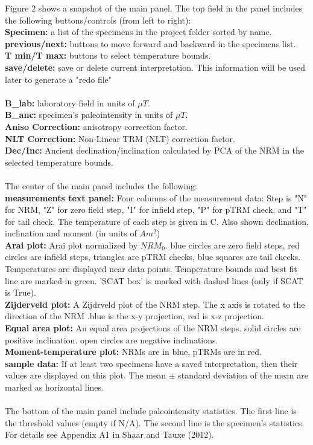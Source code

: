 \documentclass[12pt]{article}
\begin{document}
Figure 2 shows a snapshot of the main panel. The top field in the  panel includes the following buttons/controls (from left to right):\\
{\bf Specimen:} a list of the specimens in the project folder sorted by name.\\
{\bf previous/next:} buttons to move forward and backward in the specimens list.\\
{\bf T min/T max:} buttons to select temperature bounds.\\
{\bf save/delete:} save or delete current interpretation. This information will be used later to generate a "redo file" \\
\\
{\bf B\_lab:} laboratory field in units of $\mu T$.\\
{\bf B\_anc:} specimen's paleointensity in units of $\mu T$.\\
{\bf Aniso Correction:} anisotropy correction factor.\\
{\bf NLT Correction:} Non-Linear TRM (NLT) correction factor.\\
{\bf Dec/Inc:} Ancient declination/inclination calculated by PCA of the NRM in the selected temperature bounds.\\
\\
The center of the main panel includes the following:\\
{\bf measurements text panel:} Four columns of the measurement data: Step is "N" for NRM, "Z" for zero field step, "I" for infield step, "P" for pTRM check, and "T" for tail check. The temperature of each step is given in C. Also shown  declination, inclination and moment (in units of $Am^2$) \\
{\bf Arai plot:}  Arai plot normalized by $NRM_0$. blue circles are zero field steps, red circles are infield steps, triangles are pTRM checks, blue squares are tail checks. Temperatures are displayed near data points. Temperature bounds and best fit line are marked in green. 'SCAT box' is marked with dashed lines (only if SCAT is True). \\
{\bf Zijderveld plot:}  A Zijdrveld plot of the NRM step.  The x axis is rotated to the direction of the NRM  .blue is the x-y  projection, red is x-z projection.\\
{\bf Equal area plot:}  An equal area projections  of the NRM steps. solid circles are positive inclination. open circles are negative inclinations.\\
{\bf Moment-temperature plot:}  NRMs are in blue, pTRMs are in red.\\
{\bf sample data:}  If at least two specimens have a saved interpretation, then their values are displayed on this plot. The mean $\pm$ standard deviation of the mean are marked as  horizontal lines. \\
\\
The bottom of the main panel include paleointensity statistics. The first line is the threshold values (empty if N/A). The second line is the specimen's statistics. For details see Appendix A1 in Shaar and Tauxe (2012).
\end{document}
